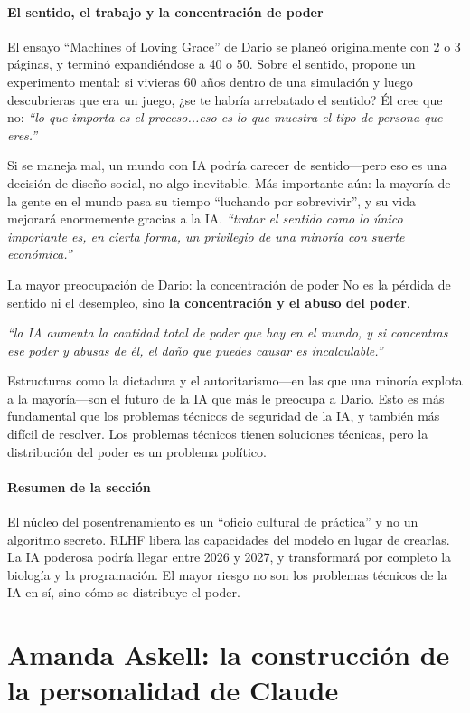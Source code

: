 \subsection{El sentido, el trabajo y la concentración de poder}

El ensayo ``Machines of Loving Grace'' de Dario se planeó originalmente con 2 o 3 páginas, y terminó expandiéndose a 40 o 50. Sobre el sentido, propone un experimento mental: si vivieras 60 años dentro de una simulación y luego descubrieras que era un juego, ¿se te habría arrebatado el sentido? Él cree que no: \textit{``lo que importa es el proceso...eso es lo que muestra el tipo de persona que eres.''}

Si se maneja mal, un mundo con IA podría carecer de sentido—pero eso es una decisión de diseño social, no algo inevitable. Más importante aún: la mayoría de la gente en el mundo pasa su tiempo ``luchando por sobrevivir'', y su vida mejorará enormemente gracias a la IA. \textit{``tratar el sentido como lo único importante es, en cierta forma, un privilegio de una minoría con suerte económica.''}

\begin{warningbox}{La mayor preocupación de Dario: la concentración de poder}
No es la pérdida de sentido ni el desempleo, sino \textbf{la concentración y el abuso del poder}.

\textit{``la IA aumenta la cantidad total de poder que hay en el mundo, y si concentras ese poder y abusas de él, el daño que puedes causar es incalculable.''}

Estructuras como la dictadura y el autoritarismo—en las que una minoría explota a la mayoría—son el futuro de la IA que más le preocupa a Dario. Esto es más fundamental que los problemas técnicos de seguridad de la IA, y también más difícil de resolver. Los problemas técnicos tienen soluciones técnicas, pero la distribución del poder es un problema político.
\end{warningbox}

\subsection{Resumen de la sección}

El núcleo del posentrenamiento es un ``oficio cultural de práctica'' y no un algoritmo secreto. RLHF libera las capacidades del modelo en lugar de crearlas. La IA poderosa podría llegar entre 2026 y 2027, y transformará por completo la biología y la programación. El mayor riesgo no son los problemas técnicos de la IA en sí, sino cómo se distribuye el poder.

\part{Amanda Askell: la construcción de la personalidad de Claude}

